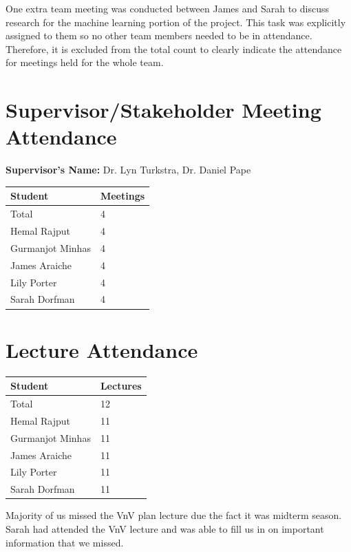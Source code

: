 \documentclass{article}
\begin{document}
One extra team meeting was conducted between James and Sarah to discuss research for the machine learning portion of the project. This task was explicitly assigned to them so no other team members needed to be in attendance. Therefore, it is excluded from the total count to clearly indicate the attendance for meetings held for the whole team.

\section{Supervisor/Stakeholder Meeting Attendance}

\noindent \textbf{Supervisor's Name: } Dr. Lyn Turkstra, Dr. Daniel Pape

\begin{table}[H]
\centering
\begin{tabular}{ll}
\toprule
\textbf{Student} & \textbf{Meetings}\\
\midrule
Total & 4\\
Hemal Rajput & 4\\
Gurmanjot Minhas & 4\\
James Araiche & 4\\
Lily Porter & 4\\
Sarah Dorfman & 4\\
\bottomrule
\end{tabular}
\end{table}

\section{Lecture Attendance}

\begin{table}[H]
\centering
\begin{tabular}{ll}
\toprule
\textbf{Student} & \textbf{Lectures}\\
\midrule
Total & 12\\
Hemal Rajput & 11\\
Gurmanjot Minhas & 11\\
James Araiche & 11\\
Lily Porter & 11\\
Sarah Dorfman & 11\\
\bottomrule
\end{tabular}
\end{table}

Majority of us missed the VnV plan lecture due the fact it was midterm season. Sarah had attended the VnV lecture and was able to fill us in on important information that we missed.
\end{document}
